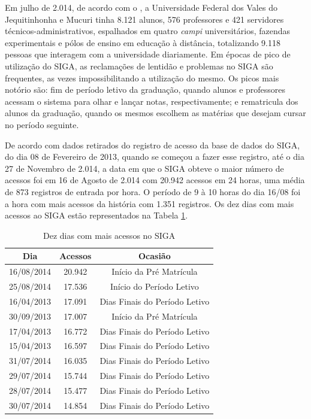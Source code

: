 Em julho de 2.014, de acordo com o , a Universidade 
Federal dos 
Vales do Jequitinhonha e Mucuri tinha 8.121 alunos, 576 professores e 421 
servidores técnicos-administrativos, espalhados em quatro \textit{campi} 
universitários, fazendas experimentais e pólos de ensino em educação à 
distância, totalizando 9.118 pessoas que interagem com a universidade 
diariamente. Em épocas de pico de utilização do SIGA, as reclamações de 
lentidão 
e problemas no SIGA são frequentes, as vezes impossibilitando a utilização do 
mesmo. Os picos mais notório são: fim de período letivo da graduação, quando 
alunos e professores acessam o sistema para olhar e lançar notas, 
respectivamente; e rematricula dos alunos da graduação, quando os mesmos 
escolhem as matérias que desejam cursar no período seguinte.

De acordo com dados retirados do registro de acesso da base de dados 
do SIGA, do dia 08 de Fevereiro de 2013, quando se começou a fazer esse 
registro, até o dia 27 de Novembro de 2.014, a data em que o SIGA obteve o 
maior número de acessos foi em 16 de Agosto de 2.014 com 20.942 acessos em 24 
horas, uma média de 873 registros de entrada por hora. O período de 9 à 10 
horas do dia 16/08 foi a hora com mais acessos da história com 1.351 
registros. Os dez dias com mais acessos ao SIGA estão representados na Tabela 
\ref{tab:top10acessos}.

\begin{table}[htb]
	\centering
	\ABNTEXfontereduzida
	\caption{Dez dias com mais acessos no SIGA}
	\label{tab:top10acessos}
	\begin{tabular}{|c|c|c|}
		\hline
		\textbf{Dia} & \textbf{Acessos}  & \textbf{Ocasião} \\ \hline
		16/08/2014 & 20.942 & Início da Pré Matrícula \\ \hline
		25/08/2014 & 17.536 & Início do Período Letivo \\ \hline
		16/04/2013 & 17.091 & Dias Finais do Período Letivo \\ \hline
		30/09/2013 & 17.007 & Início da Pré Matrícula \\ \hline
		17/04/2013 & 16.772 & Dias Finais do Período Letivo \\ \hline
		15/04/2013 & 16.597 & Dias Finais do Período Letivo \\ \hline
		31/07/2014 & 16.035 & Dias Finais do Período Letivo \\ \hline
		29/07/2014 & 15.744 & Dias Finais do Período Letivo \\ \hline
		28/07/2014 & 15.477 & Dias Finais do Período Letivo \\ \hline
		30/07/2014 & 14.854 & Dias Finais do Período Letivo \\ \hline
	\end{tabular}
\end{table}

